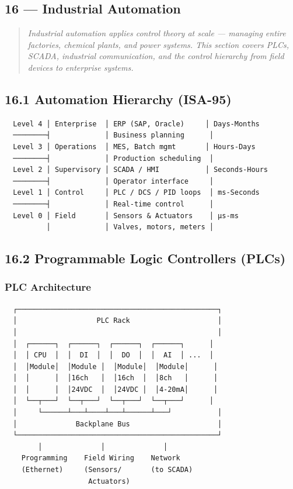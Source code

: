 \documentclass[11pt,a4paper]{book}
\begin{document}
\begin{itemize}
\section{16 — Industrial Automation}

\begin{quote}
\textit{Industrial automation applies control theory at scale — managing entire factories, chemical plants, and power systems. This section covers PLCs, SCADA, industrial communication, and the control hierarchy from field devices to enterprise systems.}
\end{quote}

\medskip\noindent\hrulefill\medskip

\subsection{16.1 Automation Hierarchy (ISA-95)}

\begin{lstlisting}
  Level 4 │ Enterprise  │ ERP (SAP, Oracle)     │ Days-Months
  ────────┤             │ Business planning      │
  Level 3 │ Operations  │ MES, Batch mgmt       │ Hours-Days
  ────────┤             │ Production scheduling  │
  Level 2 │ Supervisory │ SCADA / HMI           │ Seconds-Hours
  ────────┤             │ Operator interface     │
  Level 1 │ Control     │ PLC / DCS / PID loops  │ ms-Seconds
  ────────┤             │ Real-time control      │
  Level 0 │ Field       │ Sensors & Actuators    │ µs-ms
          │             │ Valves, motors, meters │
\end{lstlisting}

\medskip\noindent\hrulefill\medskip

\subsection{16.2 Programmable Logic Controllers (PLCs)}

\subsubsection{PLC Architecture}

\begin{lstlisting}
  ┌────────────────────────────────────────────────┐
  │                   PLC Rack                     │
  │                                                │
  │  ┌──────┐  ┌──────┐  ┌──────┐  ┌──────┐      │
  │  │ CPU  │  │  DI  │  │  DO  │  │  AI  │ ...  │
  │  │Module│  │Module │  │Module│  │Module│      │
  │  │      │  │16ch   │  │16ch  │  │8ch   │      │
  │  │      │  │24VDC  │  │24VDC │  │4-20mA│      │
  │  └──┬───┘  └──┬───┘  └──┬───┘  └──┬───┘      │
  │     └──────┴───┴────┴───┴──────┴───┘           │
  │              Backplane Bus                     │
  └────────────────────────────────────────────────┘
        │              │              │
    Programming    Field Wiring    Network
    (Ethernet)     (Sensors/       (to SCADA)
                    Actuators)
\end{lstlisting}


\end{itemize}
\end{document}
